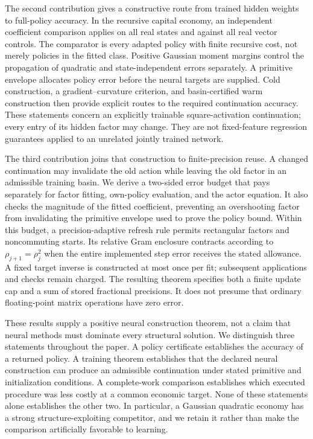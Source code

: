\documentclass[ecta,nameyear,draft]{econsocart}
\theoremstyle{definition}
\theoremstyle{remark}
\begin{document}
The second contribution gives a constructive route from trained hidden
weights to full-policy accuracy. In the recursive capital economy, an
independent coefficient comparison applies on all real states and against
all real vector controls. The comparator is every adapted policy with finite
recursive cost, not merely policies in the fitted class. Positive Gaussian
moment margins control the propagation of quadratic and state-independent
errors separately. A primitive envelope allocates policy error before the
neural targets are supplied. Cold construction, a gradient--curvature
criterion, and basin-certified warm construction then provide explicit routes
to the required continuation accuracy. These statements concern an explicitly
trainable square-activation continuation; every entry of its hidden factor
may change. They are not fixed-feature regression guarantees applied to an
unrelated jointly trained network.

The third contribution joins that construction to finite-precision reuse.
A changed continuation may invalidate the old action while leaving the old
factor in an admissible training basin. We derive a two-sided error budget
that pays separately for factor fitting, own-policy evaluation, and the actor
equation. It also checks the magnitude of the fitted coefficient, preventing
an overshooting factor from invalidating the primitive envelope used to prove
the policy bound. Within this budget, a precision-adaptive refresh rule permits
rectangular factors and noncommuting starts. Its relative Gram enclosure
contracts according to $\rho_{j+1}=\rho_j^2$ when the entire implemented
step error receives the stated allowance. A fixed target inverse is constructed
at most once per fit; subsequent applications and checks remain charged.
The resulting theorem specifies both a finite update cap and a sum of stored
fractional precisions. It does not presume that ordinary floating-point
matrix operations have zero error.

These results supply a positive neural construction theorem, not a claim
that neural methods must dominate every structural solution. We distinguish
three statements throughout the paper. A policy certificate establishes the
accuracy of a returned policy. A training theorem establishes that the declared
neural construction can produce an admissible continuation under stated
primitive and initialization conditions. A complete-work comparison establishes
which executed procedure was less costly at a common economic target. None
of these statements alone establishes the other two. In particular, a Gaussian
quadratic economy has a strong structure-exploiting competitor, and we retain
it rather than make the comparison artificially favorable to learning.
\end{document}
